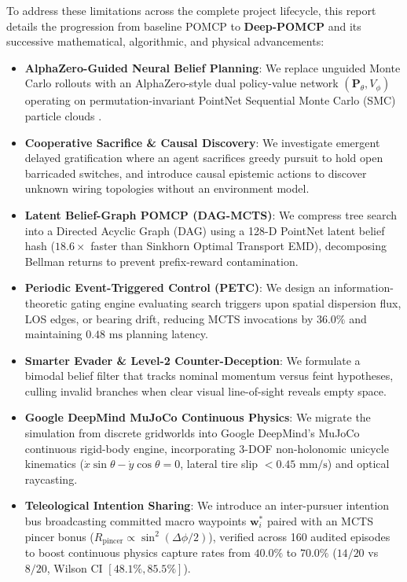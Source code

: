 \documentclass[conference]{IEEEtran}
\begin{document}
To address these limitations across the complete project lifecycle, this report details the progression from baseline POMCP to \textbf{Deep-POMCP} and its successive mathematical, algorithmic, and physical advancements:
\begin{itemize}
    \item \textbf{AlphaZero-Guided Neural Belief Planning}: We replace unguided Monte Carlo rollouts with an AlphaZero-style dual policy-value network $(\mathbf{P}_\theta, V_\phi)$ operating on permutation-invariant PointNet Sequential Monte Carlo (SMC) particle clouds \cite{qi2017pointnet, silver2017mastering, grover2018learning}.
    \item \textbf{Cooperative Sacrifice \& Causal Discovery}: We investigate emergent delayed gratification where an agent sacrifices greedy pursuit to hold open barricaded switches, and introduce causal epistemic actions to discover unknown wiring topologies without an environment model.
    \item \textbf{Latent Belief-Graph POMCP (DAG-MCTS)}: We compress tree search into a Directed Acyclic Graph (DAG) using a 128-D PointNet latent belief hash ($18.6\times$ faster than Sinkhorn Optimal Transport EMD), decomposing Bellman returns to prevent prefix-reward contamination.
    \item \textbf{Periodic Event-Triggered Control (PETC)}: We design an information-theoretic gating engine evaluating search triggers upon spatial dispersion flux, LOS edges, or bearing drift, reducing MCTS invocations by $36.0\%$ and maintaining $0.48\text{ ms}$ planning latency.
    \item \textbf{Smarter Evader \& Level-2 Counter-Deception}: We formulate a bimodal belief filter that tracks nominal momentum versus feint hypotheses, culling invalid branches when clear visual line-of-sight reveals empty space.
    \item \textbf{Google DeepMind MuJoCo Continuous Physics}: We migrate the simulation from discrete gridworlds into Google DeepMind's MuJoCo continuous rigid-body engine, incorporating 3-DOF non-holonomic unicycle kinematics ($\dot{x}\sin\theta - \dot{y}\cos\theta = 0$, lateral tire slip $< 0.45\text{ mm/s}$) and optical raycasting.
    \item \textbf{Teleological Intention Sharing}: We introduce an inter-pursuer intention bus broadcasting committed macro waypoints $\mathbf{w}_i^*$ paired with an MCTS pincer bonus ($R_{\text{pincer}} \propto \sin^2(\Delta\phi/2)$), verified across 160 audited episodes to boost continuous physics capture rates from $40.0\%$ to $\mathbf{70.0\%}$ ($14/20$ vs $8/20$, Wilson CI $[48.1\%, 85.5\%]$).
\end{itemize}
\end{document}
